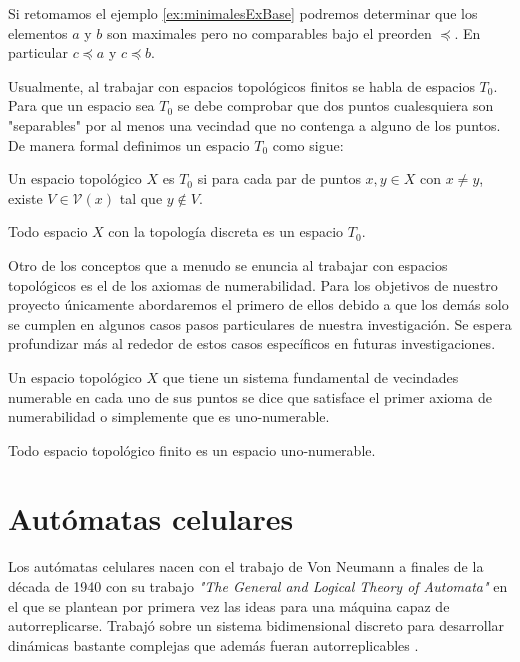 \begin{example}\label{ex:maximalesExBase}
Si retomamos el ejemplo \ref{ex:minimalesExBase} podremos determinar que los elementos $a$ y $b$ son maximales pero no comparables bajo el preorden $\preceq$. En particular $c\preceq a$ y $c\preceq b$.
\end{example}

Usualmente, al trabajar con espacios topológicos finitos se habla de espacios $T_0$. Para que un espacio sea $T_0$ se debe comprobar que dos puntos cualesquiera son "separables" por al menos una vecindad que no contenga a alguno de los puntos. De manera formal definimos un espacio $T_0$ como sigue:

\begin{definition}\label{def:espacioT0}
Un espacio topológico $X$ es $T_0$ si para cada par de puntos $x,y\in X$ con $x\neq y$, existe $V\in\mathcal{V}(x)$ tal que $y\notin V$.
\end{definition}

\begin{example}\label{ex:discretaT0}
Todo espacio $X$ con la topología discreta es un espacio $T_0$.
\end{example}

Otro de los conceptos que a menudo se enuncia al trabajar con espacios topológicos es el de los axiomas de numerabilidad. Para los objetivos de nuestro proyecto únicamente abordaremos el primero de ellos debido a que los demás solo se cumplen en algunos casos pasos particulares de nuestra investigación. Se espera profundizar más al rededor de estos casos específicos en futuras investigaciones.

\begin{definition}\label{def:espacio1Numerable}
Un espacio topológico $X$ que tiene un sistema fundamental de vecindades numerable en cada uno de sus puntos se dice que satisface el primer axioma de numerabilidad o simplemente que es uno-numerable.
\end{definition}

\begin{example}\label{ex:finito1Numerable}
Todo espacio topológico finito es un espacio uno-numerable.
\end{example}

\section{Autómatas celulares}\label{sec:Autómatas celulares}

Los autómatas celulares nacen con el trabajo de Von Neumann a finales de la década de 1940 con su trabajo \textit{"The General and Logical Theory of Automata"} en el que se plantean por primera vez las ideas para una máquina capaz de autorreplicarse. Trabajó sobre un sistema bidimensional discreto para desarrollar dinámicas bastante complejas que además fueran autorreplicables \cite{alfons2010,ACaplicacionesComputacion}.

